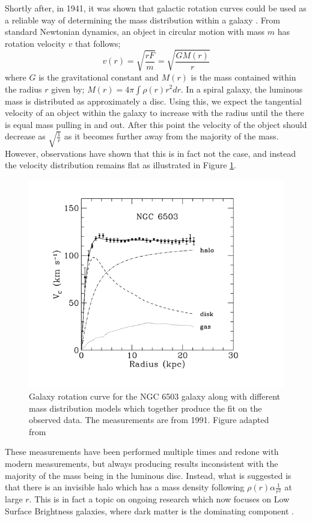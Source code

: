 \par
Shortly after, in 1941, it was shown that galactic rotation curves could be used as a reliable way of determining the mass distribution within a galaxy \cite{Chandrasekhar_1941_ref}.
From standard Newtonian dynamics, an object in circular motion with mass $m$ has rotation velocity $v$ that follows;
\begin{equation}
    v(r) = \sqrt{\frac{rF}{m}} = \sqrt{\frac{GM(r)}{r}}
    \label{eq:Kepler_Motion}
\end{equation}
where $G$ is the gravitational constant and $M(r)$ is the mass contained within the radius $r$ given by; $M(r) = 4 \pi \int \rho(r) r^{2} dr$.
In a spiral galaxy, the luminous mass is distributed as approximately a disc. 
Using this, we expect the tangential velocity of an object within the galaxy to increase with the radius until the there is equal mass pulling in and out.
After this point the velocity of the object should decrease as $\sqrt{\frac{1}{r}}$ as it becomes further away from the majority of the mass.
However, observations have shown that this is in fact not the case, and instead the velocity distribution remains flat as illustrated in Figure \ref{fig:DM_Evidence_NGC_6503}.
\begin{figure}[!htbp]%
    \centering
    \includegraphics[scale=1.0]{Figures/DarkMatterEvidence/NGC_6503_galaxy_speed.png}
    \caption{Galaxy rotation curve for the NGC 6503 galaxy along with different mass distribution models which together produce the fit on the observed data. The measurements are from 1991. Figure adapted from \cite{NGC_6503_galaxy_rotation_ref}}
    \label{fig:DM_Evidence_NGC_6503}
\end{figure}
These measurements have been performed multiple times and redone with modern measurements, but always producing results inconsistent with the majority of the mass being in the luminous disc.
Instead, what is suggested is that there is an invisible halo which has a mass density following $\rho(r) \alpha \frac{1}{r^2}$ at large $r$.
This is in fact a topic on ongoing research which now focuses on Low Surface Brightness galaxies, where dark matter is the dominating component \cite{MHONGOOSE_2018_ref}.


